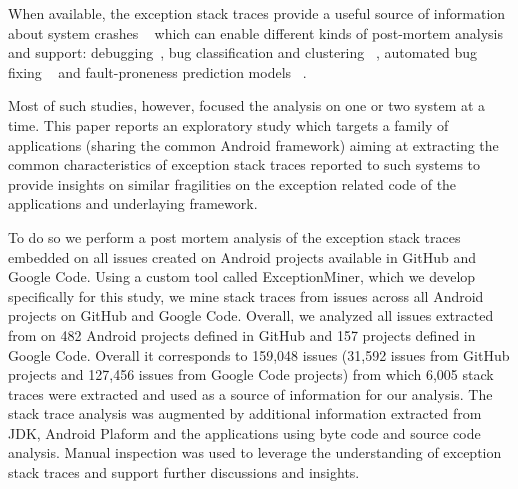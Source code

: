 \documentclass[conference]{IEEEtran}
\begin{document}
When available, the exception stack traces provide a useful source of information about system crashes ~\cite{bettenburg2008makes} which 
 can enable different kinds of post-mortem analysis and support:  debugging~\cite{schroter2010stack}, 
 bug classification and clustering ~\cite{wang2013improving, kim2011crash, dhaliwal2011classifying},  
automated bug fixing ~\cite{sinha2009fault} and fault-proneness prediction models ~\cite{kim2013predicting}. 

Most of such studies, however, focused the analysis on one or two system at a time.
This paper reports an exploratory study which targets a family of applications 
(sharing the common Android framework) aiming at extracting 
the common characteristics of exception stack traces reported to such systems to provide
insights on similar fragilities on the exception related code of the applications and underlaying framework.


To do so we perform a post mortem analysis of the exception stack traces embedded on all issues
created on Android projects available in GitHub and Google Code. Using a custom tool called ExceptionMiner,
 which we develop specifically for this study, we mine stack traces from issues across all Android projects on
GitHub and Google Code. Overall, we analyzed all issues extracted from on 482 Android projects defined in
GitHub and 157 projects defined in Google Code. Overall it corresponds to 159,048 issues (31,592 issues from GitHub projects 
and 127,456 issues from Google Code projects) from which  6,005 stack traces were extracted and used as
 a source of information for our analysis. The stack trace analysis was augmented by additional information
extracted from JDK, Android Plaform and the applications using byte code and source code analysis.
 Manual inspection was used to leverage the understanding of exception stack traces and support further discussions and insights.


\end{document}
